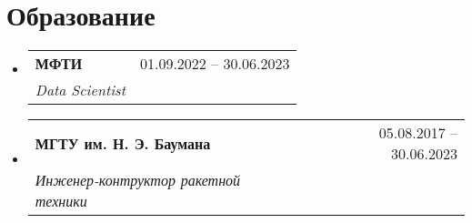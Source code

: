 \documentclass[letterpaper,11pt]{article}
\makeatletter
\newcommand{\resumeItem}[1]{
  \item\small{
    {#1 \vspace{-2pt}}
  }
}
\newcommand{\resumeSubheading}[4]{
  \vspace{-2pt}\item
    \begin{tabular*}{0.97\textwidth}[t]{l@{\extracolsep{\fill}}r}
      \textbf{#1} & #2 \\
      \textit{\small#3} & \textit{\small #4} \\
    \end{tabular*}\vspace{-7pt}
}
\newcommand{\resumeProjectHeading}[2]{
    \item
    \begin{tabular*}{0.97\textwidth}{l@{\extracolsep{\fill}}r}
      \small#1 & #2 \\
    \end{tabular*}\vspace{-7pt}
}
\newcommand{\resumeSubHeadingListStart}{\begin{itemize}[leftmargin=0.15in, label={}]}
\newcommand{\resumeSubHeadingListEnd}{\end{itemize}}
\newcommand{\resumeItemListStart}{\begin{itemize}}
\newcommand{\resumeItemListEnd}{\end{itemize}\vspace{-5pt}}
\makeatother
\begin{document}


\section{Образование}
  \resumeSubHeadingListStart
    \resumeSubheading
        {МФТИ}{01.09.2022 -- 30.06.2023}
        {Data Scientist}{}
        
    \resumeSubheading
        {МГТУ им. Н. Э. Баумана}{05.08.2017 -- 30.06.2023}
        {Инженер-контруктор ракетной техники}{}
  \resumeSubHeadingListEnd

%

\end{document}
